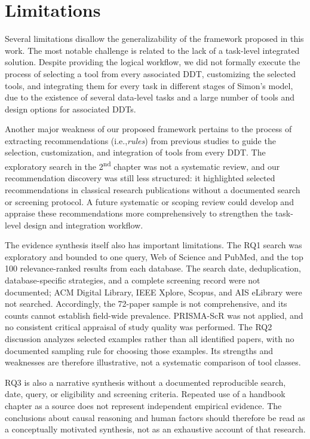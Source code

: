 \documentclass{sfuthesis}
\begin{document}
\section{Limitations}
Several limitations disallow the generalizability of the framework proposed in this work. The most notable challenge is related to the lack of a task-level integrated solution. Despite providing the logical workflow, we did not formally execute the process of selecting a tool from every associated DDT, customizing the selected tools, and integrating them for every task in different stages of Simon’s model, due to the existence of several data-level tasks and a large number of tools and design options for associated DDTs.\par
Another major weakness of our proposed framework pertains to the process of extracting recommendations (i.e.,\textit{rules}) from previous studies to guide the selection, customization, and integration of tools from every DDT. The exploratory search in the 2\textsuperscript{nd} chapter was not a systematic review, and our recommendation discovery was still less structured: it highlighted selected recommendations in classical research publications without a documented search or screening protocol. A future systematic or scoping review could develop and appraise these recommendations more comprehensively to strengthen the task-level design and integration workflow.\par
The evidence synthesis itself also has important limitations. The RQ1 search was exploratory and bounded to one query, Web of Science and PubMed, and the top 100 relevance-ranked results from each database. The search date, deduplication, database-specific strategies, and a complete screening record were not documented; ACM Digital Library, IEEE Xplore, Scopus, and AIS eLibrary were not searched. Accordingly, the 72-paper sample is not comprehensive, and its counts cannot establish field-wide prevalence. PRISMA-ScR was not applied, and no consistent critical appraisal of study quality was performed. The RQ2 discussion analyzes selected examples rather than all identified papers, with no documented sampling rule for choosing those examples. Its strengths and weaknesses are therefore illustrative, not a systematic comparison of tool classes.\par
RQ3 is also a narrative synthesis without a documented reproducible search, date, query, or eligibility and screening criteria. Repeated use of a handbook chapter as a source does not represent independent empirical evidence. The conclusions about causal reasoning and human factors should therefore be read as a conceptually motivated synthesis, not as an exhaustive account of that research.\par
\end{document}
